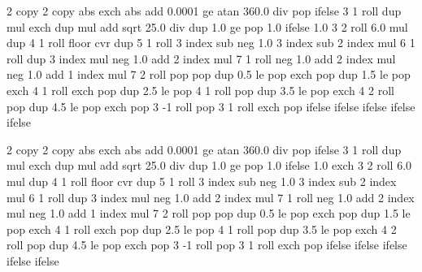 



{\pgfpoint{-50bp}{-50bp}}
{\pgfpoint{50bp}{50bp}}
{}
{ %
  2 copy %
  2 copy abs exch abs add 0.0001 ge
  {atan 360.0 div} %
  { pop } %
  ifelse  %
  3 1 roll %
  dup mul %
  exch dup mul %
  add sqrt %
  25.0 div %
  dup 1.0 ge %
  { pop 1.0 }{} ifelse %
  1.0 %
  3 2 roll 6.0 mul dup 4 1 roll %
  floor cvr  %
  dup 5 1 roll %
  3 index sub neg %
  1.0 3 index sub %
  2 index mul %
  6 1 roll %
  dup 3 index mul neg 1.0 add %
  2 index mul %
  7 1 roll %
  neg 1.0 add %
  2 index mul neg 1.0  add %
  1 index mul %
  7 2 roll %
  pop pop %
  dup 0.5 le %
  { %
    pop exch pop
  }
  { dup 1.5 le %
    { %
      pop exch 4 1 roll exch pop
    }
    { dup 2.5 le %
      { %
        pop 4 1 roll pop
      }
      { dup 3.5 le %
        { %
          pop exch 4 2 roll pop
        }
        { dup 4.5 le %
          { %
            pop exch pop 3 -1 roll
          }
          { %
            pop 3 1 roll exch pop
          }
          ifelse
        }
        ifelse %
      }
      ifelse %
    }
    ifelse %
  }
  ifelse %
  \ifpgfshadingmodelcmyk
    \pgffuncshadingrgbtocmyk
  \fi
  \ifpgfshadingmodelgray
    \pgffuncshadingrgbtogray
  \fi
}%

{\pgfpoint{-50bp}{-50bp}}
{\pgfpoint{50bp}{50bp}}
{}
{ %
  2 copy %
  2 copy abs exch abs add 0.0001 ge
  {atan 360.0 div} %
  { pop } %
  ifelse  %
  3 1 roll %
  dup mul %
  exch dup mul %
  add sqrt %
  25.0 div %
  dup 1.0 ge %
  { pop 1.0 }{} ifelse %
  1.0 exch %
  3 2 roll 6.0 mul dup 4 1 roll %
  floor cvr  %
  dup 5 1 roll %
  3 index sub neg %
  1.0 3 index sub %
  2 index mul %
  6 1 roll %
  dup 3 index mul neg 1.0 add %
  2 index mul %
  7 1 roll %
  neg 1.0 add %
  2 index mul neg 1.0  add %
  1 index mul %
  7 2 roll %
  pop pop %
  dup 0.5 le %
  { %
    pop exch pop
  }
  { dup 1.5 le %
    { %
      pop exch 4 1 roll exch pop
    }
    { dup 2.5 le %
      { %
        pop 4 1 roll pop
      }
      { dup 3.5 le %
        { %
          pop exch 4 2 roll pop
        }
        { dup 4.5 le %
          { %
            pop exch pop 3 -1 roll
          }
          { %
            pop 3 1 roll exch pop
          }
          ifelse
        }
        ifelse %
      }
      ifelse %
    }
    ifelse %
  }
  ifelse %
  \ifpgfshadingmodelcmyk
    \pgffuncshadingrgbtocmyk
  \fi
  \ifpgfshadingmodelgray
    \pgffuncshadingrgbtogray
  \fi
}%

